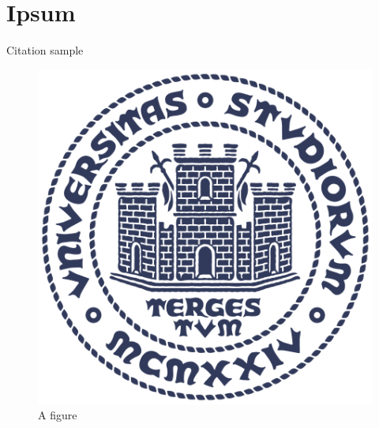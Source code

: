 \section{Ipsum}

Citation sample~\cite{latexcompanion}

\begin{figure}[!ht]\label{fig:example}
\centering
\includegraphics[width=.8\textwidth]{img/units_logo.png}
\caption{A figure}
\end{figure}

\lipsum[3]

